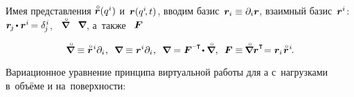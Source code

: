 \begin{otherlanguage}{russian}
Имея представления ${\initiallocationvector(q^i)}$ и~${\bm{r}(q^i\hspace{-0.4ex}, t)}$,
вводим базис~${\bm{r}_i \equiv \partial_i \bm{r}}\hspace{-0.2ex}$,
взаимный базис~${\bm{r}^i}$: ${\currentlocationvector_{\hspace{-0.2ex}j} \hspace{-0.2ex} \dotp \currentlocationvector^i \hspace{-0.25ex} = \delta^{\hspace{.1ex}i}_{\hspace{-0.2ex}j}}$,
~$\boldnablacircled$ ~${\hspace{-0.16ex}\bm{\nabla}\hspace{-0.2ex}}\hspace{-0.1ex}$,
а~также ~$\bm{F}$

\nopagebreak\vspace{-0.1em}\begin{equation}
\boldnablacircled \equiv \initiallocationvector^{\hspace{.1ex}i} \partial_i
\hspace{.1ex} ,
\:\;
\boldnabla \equiv \currentlocationvector^i \partial_i
\hspace{.1ex} ,
\:\;
\boldnabla = \motiongradient^{\expminusT} \hspace{-0.32ex} \dotp \boldnablacircled
,
\:\;
\motiongradient \equiv \hspace{-0.16ex}
\boldnablacircled \currentlocationvector^{\T} \hspace{-0.5ex}
= \currentlocationvector_i \hspace{.2ex} \initiallocationvector^{\hspace{.1ex}i}
\hspace{-0.25ex} .
\end{equation}

Вариационное уравнение принципа виртуальной работы для \rucontinuum{}а с~нагрузками в~объёме и на~поверхности:


\end{otherlanguage}

